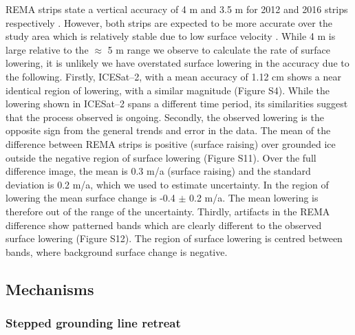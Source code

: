 REMA strips state a vertical accuracy of 4 m and 3.5 m for 2012 and 2016 strips respectively \citep{noh2015automated,howat2019reference}. However, both strips are expected to be more accurate over the study area which is relatively stable due to low surface velocity \citep{rignot2017measures}. While 4 m is large relative to the $\approx$ 5 m range we observe to calculate the rate of surface lowering, it is unlikely we have overstated surface lowering in the accuracy due to the following. Firstly, ICESat–2, with a mean accuracy of 1.12 cm shows a near identical region of lowering, with a similar magnitude (Figure S4). While the lowering shown in ICESat--2 spans a different time period, its similarities suggest that the process observed is ongoing. Secondly, the observed lowering is the opposite sign from the general trends and error in the data. The mean of the difference between REMA strips is positive (surface raising) over grounded ice outside the negative region of surface lowering (Figure S11). Over the full difference image, the mean is 0.3 m/a (surface raising) and the standard deviation is 0.2 m/a, which we used to estimate uncertainty. In the region of lowering the mean surface change is -0.4 $\pm$ 0.2 m/a. The mean lowering is therefore out of the range of the uncertainty. Thirdly, artifacts in the REMA difference show patterned bands which are clearly different to the observed surface lowering (Figure S12). The region of surface lowering is centred between bands, where background surface change is negative.

\subsection{Mechanisms} \label{sec:shape}
\subsubsection{Stepped grounding line retreat} \label{sec:retreat}

